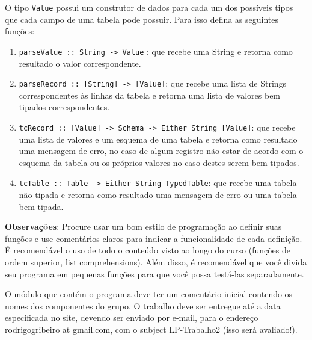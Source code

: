 \documentclass[11pt,a4paper]{report}
\begin{document}
O tipo \texttt{Value} possui um construtor de dados para cada um dos poss\'iveis tipos que cada campo de uma tabela 
pode possuir. Para isso defina as seguintes fun\c{c}\~oes:
\begin{enumerate}
	\item \texttt{parseValue :: String -> Value} : que recebe uma String e retorna como resultado o valor correspondente.
	\item \texttt{parseRecord :: [String] -> [Value]}: que recebe uma lista de Strings correspondentes \`as linhas da
	      tabela e retorna uma lista de valores bem tipados correspondentes.
	\item \texttt{tcRecord :: [Value] -> Schema -> Either String [Value]}: que recebe uma lista de valores e um esquema
	      de uma tabela e retorna como resultado uma mensagem de erro, no caso de algum registro n\~ao estar de acordo
	      com o esquema da tabela ou os pr\'oprios valores no caso destes serem bem tipados.
	\item \texttt{tcTable :: Table -> Either String TypedTable}: que recebe uma tabela n\~ao tipada e retorna como 
	      resultado uma mensagem de erro ou uma tabela bem tipada.
\end{enumerate}
\textbf{Observa\c{c}\~oes}: Procure usar um bom estilo de programa\c{c}\~ao ao definir suas fun\c{c}\~oes e use
 coment\'arios claros para indicar a funcionalidade de cada defini\c{c}\~ao. \'E recomend\'avel o uso de todo o 
 conte\'udo visto ao longo do curso (fun\c{c}\~oes de ordem superior, list comprehensions). Al\'em disso, \'e 
 recomend\'avel que voc\^e divida seu programa em pequenas fun\c{c}\~oes para que voc\^e possa test\'a-las 
 separadamente. 
 
O m\'odulo que cont\'em o programa deve ter um coment\'ario inicial contendo os nomes dos componentes do grupo. 
O trabalho deve ser entregue at\'e a data especificada no site, devendo ser enviado por e-mail, para o
endere\c{c}o rodrigogribeiro at gmail.com, com o subject LP-Trabalho2 (isso ser\'a avaliado!).
\end{document}
